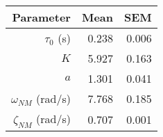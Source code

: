 \begin{tabular}{*{3}{r}}
    \toprule
    Parameter             & Mean  & SEM   \\
    \midrule
    $\tau_0$ (s)          & 0.238 & 0.006 \\
    $K$                   & 5.927 & 0.163 \\
    $a$                   & 1.301 & 0.041 \\
    $\omega_{NM}$ (rad/s) & 7.768 & 0.185 \\
    $\zeta_{NM}$ (rad/s)  & 0.707 & 0.001 \\
    \bottomrule
\end{tabular}

